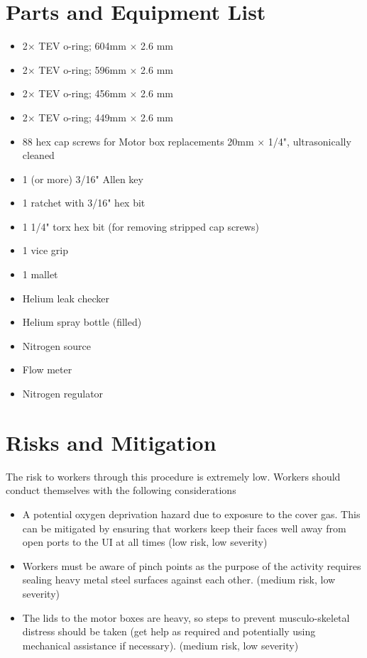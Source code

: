 \documentclass[11pt]{article}
\begin{document}
\section{Parts and Equipment List}
\begin{itemize}
	\item 2$\times$ TEV o-ring; 604mm $\times$ 2.6 mm
	\item 2$\times$ TEV o-ring; 596mm $\times$ 2.6 mm
	\item 2$\times$ TEV o-ring; 456mm $\times$ 2.6 mm
	\item 2$\times$ TEV o-ring; 449mm $\times$ 2.6 mm
	\item 88 hex cap screws for Motor box replacements 20mm $\times$ 1/4", ultrasonically cleaned
	\item 1 (or more) 3/16" Allen key
	\item 1 ratchet with 3/16" hex bit
	\item 1 1/4" torx hex bit (for removing stripped cap screws)
	\item 1 vice grip
	\item 1 mallet
	\item Helium leak checker
	\item Helium spray bottle (filled)
	\item Nitrogen source
	\item Flow meter
	\item Nitrogen regulator
\end{itemize}


\section{Risks and Mitigation}

The risk to workers through this procedure is extremely low. Workers should conduct themselves with the following considerations 
\begin{itemize}
\item  A potential oxygen deprivation hazard due to  exposure to the cover gas. This can be mitigated by ensuring that workers keep their faces well away from open ports to the UI at all times (low risk, low severity)
\item Workers must be aware of pinch points as the purpose of the activity requires sealing heavy metal steel surfaces against each other. (medium risk, low severity)
\item The lids to the motor boxes are heavy, so steps to prevent musculo-skeletal distress should be taken (get help as required and potentially using mechanical assistance if necessary). (medium risk, low severity)
\end{itemize}
\end{document}
